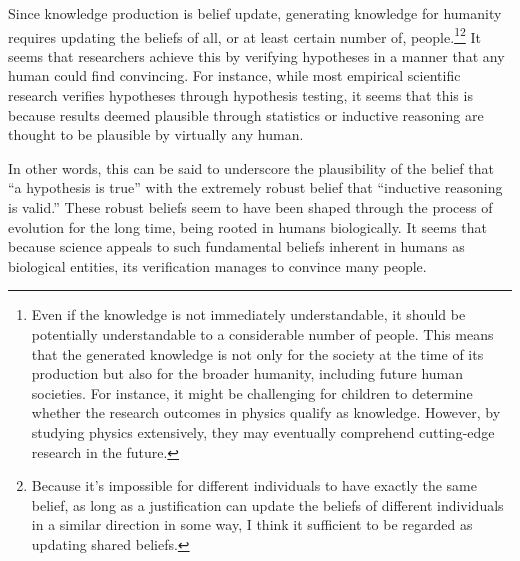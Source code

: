 Since knowledge production is belief update, generating knowledge for humanity requires updating the beliefs of all, or at least certain number of, people.\footnote{
Even if the knowledge is not immediately understandable, it should be potentially understandable to a considerable number of people. This means that the generated knowledge is not only for the society at the time of its production but also for the broader humanity, including future human societies. For instance, it might be challenging for children to determine whether the research outcomes in physics qualify as knowledge. However, by studying physics extensively, they may eventually comprehend cutting-edge research in the future. 
}\footnote{
Because it's impossible for different individuals to have exactly the same belief, as long as a justification can update the beliefs of different individuals in a similar direction in some way, I think it sufficient to be regarded as updating shared beliefs.
} 
It seems that researchers achieve this by verifying hypotheses in a manner that any human could find convincing. For instance, while most empirical scientific research verifies hypotheses through hypothesis testing, it seems that this is because results deemed plausible through statistics or inductive reasoning are thought to be plausible by virtually any human.



In other words, this can be said to underscore the plausibility of the belief that ``a hypothesis is true'' with the extremely robust belief that ``inductive reasoning is valid.'' These robust beliefs seem to have been shaped through the process of evolution for the long time, being rooted in humans biologically. It seems that because science appeals to such fundamental beliefs inherent in humans as biological entities, its verification manages to convince many people.

